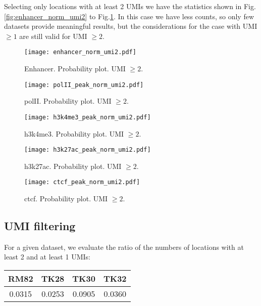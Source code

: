 \documentclass[11pt,a4paper]{article}
\begin{document}
Selecting only locations with at least 2 UMIs we have the statistics shown in Fig.\ref{fig:enhancer_norm_umi2} to Fig.\ref{fig:ctcf_norm_umi2}. In this case we have less counts, so only few datasets provide meaningful results, but the considerations for the case with UMI $\geq 1$ are still valid for UMI $\geq 2$.

\begin{figure}[hbtp]
\begin{minipage}[t]{0.45\textwidth}
\texttt{[image: enhancer\_norm\_umi2.pdf]}
\caption{Enhancer. Probability plot. UMI $\geq 2$.}
\label{fig:enhancer_norm_umi2}
\end{minipage}
\hspace{\fill}
\begin{minipage}[t]{0.5\textwidth}
\texttt{[image: polII\_peak\_norm\_umi2.pdf]}
\caption{polII. Probability plot. UMI $\geq 2$.}
\label{fig:polII_norm_umi2}
\end{minipage}
\vspace*{0.5cm} %
\begin{minipage}[t]{0.45\textwidth}
\texttt{[image: h3k4me3\_peak\_norm\_umi2.pdf]}
\caption{h3k4me3. Probability plot. UMI $\geq 2$.}
\label{fig:h3k4me3_norm_umi2}
\end{minipage}
\hspace{\fill}
\begin{minipage}[t]{0.45\textwidth}
\texttt{[image: h3k27ac\_peak\_norm\_umi2.pdf]}
\caption{h3k27ac. Probability plot. UMI $\geq 2$.}
\label{fig:h3k27ac_norm_umi2}
\end{minipage}
\vspace*{0.5cm} %
\begin{minipage}[t]{0.45\textwidth}
\texttt{[image: ctcf\_peak\_norm\_umi2.pdf]}
\caption{ctcf. Probability plot. UMI $\geq 2$.}
\label{fig:ctcf_norm_umi2}
\end{minipage}
\end{figure}

\subsection{UMI filtering}
For a given dataset, we evaluate the ratio of the numbers of locations with at least 2 and at least 1 UMIs:
\begin{tabular}{|c|c|c|c|}
\hline 
\rule[-1ex]{0pt}{2.5ex} RM82 & TK28 & TK30 & TK32 \\ 
\hline 
\rule[-1ex]{0pt}{2.5ex} 0.0315 & 0.0253 & 0.0905 & 0.0360 \\ 
\hline 
\end{tabular} 
\end{document}
